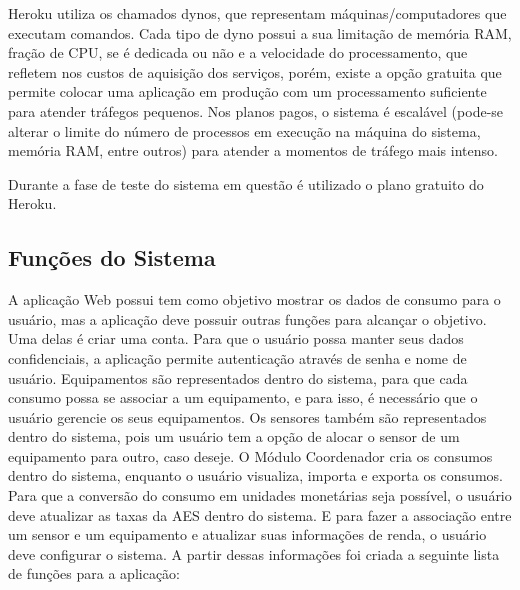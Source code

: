 Heroku utiliza os chamados dynos, que representam máquinas/computadores que executam comandos. Cada tipo de dyno possui a sua limitação de memória RAM, fração de CPU, se é dedicada ou não e a velocidade do processamento, que refletem nos custos de aquisição dos serviços, porém, existe a opção gratuita que permite colocar uma aplicação em produção com um processamento suficiente para atender tráfegos pequenos. Nos planos pagos, o sistema é escalável (pode-se alterar o limite do número de processos em execução na máquina do sistema, memória RAM, entre outros) para atender a momentos de tráfego mais intenso.\cite{heroku}

Durante a fase de teste do sistema em questão é utilizado o plano gratuito do Heroku.

\subsection{Funções do Sistema}

A aplicação Web possui tem como objetivo mostrar os dados de consumo para o usuário, mas a aplicação deve possuir outras funções para alcançar o objetivo. Uma delas é criar uma conta. Para que o usuário possa manter seus dados confidenciais, a aplicação permite autenticação através de senha e nome de usuário. Equipamentos são  representados dentro do sistema, para que cada consumo possa se associar a um equipamento, e para isso, é necessário que o usuário gerencie os seus equipamentos. Os sensores também são representados dentro do sistema, pois um usuário tem a opção de alocar o sensor de um equipamento para outro, caso deseje. O Módulo Coordenador cria os consumos dentro do sistema, enquanto o usuário visualiza, importa e exporta os consumos. Para que a conversão do consumo em unidades monetárias seja possível, o usuário deve atualizar as taxas da AES dentro do sistema. E para fazer a associação entre um sensor e um equipamento e atualizar suas informações de renda, o usuário deve configurar o sistema. A partir dessas informações foi criada a seguinte lista de funções para a aplicação:

